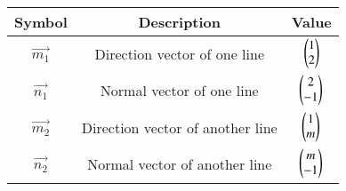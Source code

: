\begin{tabular}{|c|c|c|}
    \hline
        \textbf{Symbol} &\textbf{Description}&\textbf{Value}  \\
        \hline
         $\vec{m_1}$&Direction vector of one line&$\begin{pmatrix}
             1\\2
         \end{pmatrix}$\\
         \hline
         $\vec{n_1}$&Normal vector of one line&$\begin{pmatrix}
             2\\-1
         \end{pmatrix}$\\
         \hline
        $\vec{m_2}$&Direction vector of another line&$\begin{pmatrix}
             1\\m
         \end{pmatrix}$\\
         \hline
          $\vec{n_2}$&Normal vector of another line&$\begin{pmatrix}
             m\\-1
         \end{pmatrix}$\\
         \hline
    \end{tabular}

